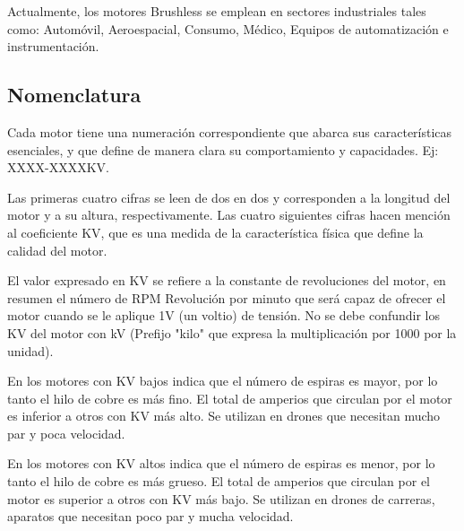 \documentclass[../main]{subfiles}
\begin{document}
Actualmente, los motores Brushless se emplean en sectores industriales tales como: Automóvil, Aeroespacial, Consumo, Médico, Equipos de automatización e instrumentación.



\subsection{Nomenclatura}

Cada motor tiene una numeración correspondiente que abarca sus características esenciales, y que define de manera clara su comportamiento y capacidades. Ej: XXXX-XXXXKV.

Las primeras cuatro cifras se leen de dos en dos y corresponden a la longitud del motor y a su altura, respectivamente. Las cuatro siguientes cifras hacen mención al coeficiente KV, que es una medida de la característica física que define la calidad del motor.

El valor expresado en KV se refiere a la constante de revoluciones del motor, en resumen el número de RPM Revolución por minuto que será capaz de ofrecer el motor cuando se le aplique 1V (un voltio) de tensión. No se debe confundir los KV del motor con kV (Prefijo "kilo" que expresa la multiplicación por 1000 por la unidad).

En los motores con KV bajos indica que el número de espiras es mayor, por lo tanto el hilo de cobre es más fino. El total de amperios que circulan por el motor es inferior a otros con KV más alto. Se utilizan en drones que necesitan mucho par y poca velocidad.

En los motores con KV altos indica que el número de espiras es menor, por lo tanto el hilo de cobre es más grueso. El total de amperios que circulan por el motor es superior a otros con KV más bajo. Se utilizan en drones de carreras, aparatos que necesitan poco par y mucha velocidad.
\end{document}
